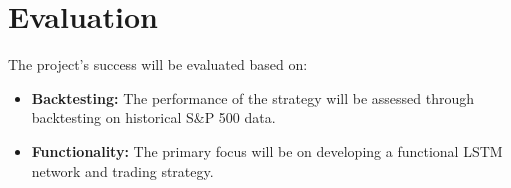 \section{Evaluation}

The project's success will be evaluated based on:

\begin{itemize}
\item \textbf{Backtesting:} The performance of the strategy will be assessed through backtesting on historical S\&P 500 data.
\item \textbf{Functionality:} The primary focus will be on developing a functional LSTM network and trading strategy.
\end{itemize}


